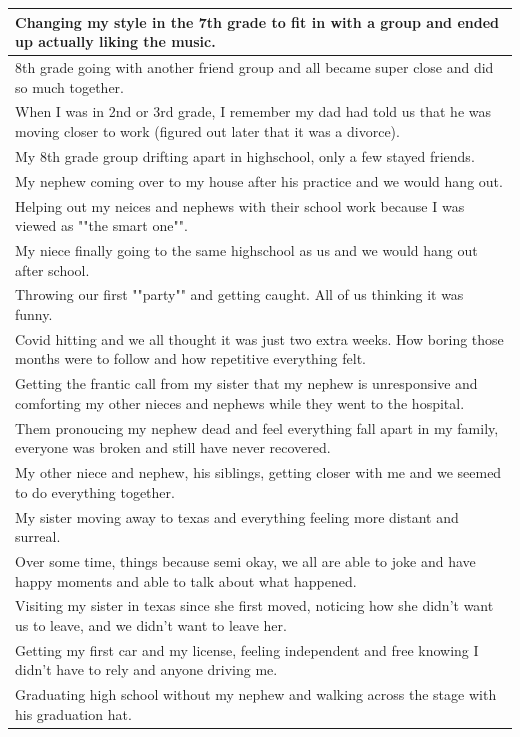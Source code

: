 \documentclass[
  .7em,
  letterpaper,
  DIV=11,
  numbers=noendperiod]{scrartcl}
\begin{document}
\begin{table}
\begin{tabular}{l}
\hline
Changing my style in the 7th grade to fit in with a group and ended up actually liking the music.\\
\hline
8th grade going with another friend group and all became super close and did so much together.\\
\hline
When I was in 2nd or 3rd grade, I remember my dad had told us that he was moving closer to work (figured out later that it was a divorce).\\
\hline
My 8th grade group drifting apart in highschool, only a few stayed friends.\\
\hline
My nephew coming over to my house after his practice and we would hang out.\\
\hline
Helping out my neices and nephews with their school work because I was viewed as ""the smart one"".\\
\hline
My niece finally going to the same highschool as us and we would hang out after school.\\
\hline
Throwing our first ""party"" and getting caught. All of us thinking it was funny.\\
\hline
Covid hitting and we all thought it was just two extra weeks. How boring those months were to follow and how repetitive everything felt.\\
\hline
Getting the frantic call from my sister that my nephew is unresponsive and comforting my other nieces and nephews while they went to the hospital.\\
\hline
Them pronoucing my nephew dead and feel everything fall apart in my family, everyone was broken and still have never recovered.\\
\hline
My other niece and nephew, his siblings, getting closer with me and we seemed to do everything together.\\
\hline
My sister moving away to texas and everything feeling more distant and surreal.\\
\hline
Over some time, things because semi okay, we all are able to joke and have happy moments and able to talk about what happened.\\
\hline
Visiting my sister in texas since she first moved, noticing how she didn't want us to leave, and we didn't want to leave her.\\
\hline
Getting my first car and my license, feeling independent and free knowing I didn't have to rely and anyone driving me.\\
\hline
Graduating high school without my nephew and walking across the stage with his graduation hat.\\

\end{tabular}
\end{table}
\end{document}
